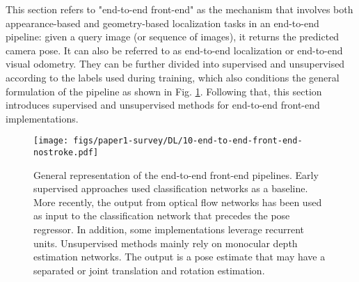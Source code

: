 This section refers to "end-to-end front-end" as the mechanism that involves both appearance-based and geometry-based localization tasks in an end-to-end pipeline: given a query image (or sequence of images), it returns the predicted camera pose. It can also be referred to as end-to-end localization or end-to-end visual odometry.
They can be further divided into supervised and unsupervised according to the labels used during training, which also conditions the general formulation of the pipeline as shown in Fig. \ref{gif:end2end-frontend}. Following that, this section introduces supervised and unsupervised methods for end-to-end front-end implementations.


\begin{figure}[b!]
  \centering
  \texttt{[image: figs/paper1-survey/DL/10-end-to-end-front-end-nostroke.pdf]}
  \caption[General representation of the end-to-end front-end pipelines]{General representation of the end-to-end front-end pipelines. Early supervised approaches used classification networks as a baseline. More recently, the output from optical flow networks has been used as input to the classification network that precedes the pose regressor. In addition, some implementations leverage recurrent units. Unsupervised methods mainly rely on monocular depth estimation networks. The output is a pose estimate that may have a separated or joint translation and rotation estimation. }
  \label{gif:end2end-frontend}
\end{figure}


